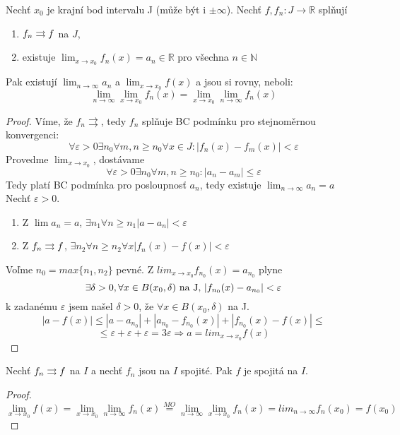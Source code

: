 \begin{vetat}
Nechť $x_0$ je krajní bod intervalu J (může být i $\pm \infty$). Nechť $f, f_n : J \rightarrow \mathbb{R}$ splňují
\begin{enumerate}
\item $f_n \rightrightarrows f$ na $J$,
\item existuje $\lim_{x \rightarrow x_0} f_n(x) = a_n \in \mathbb{R}$ pro všechna $n \in \mathbb{N}$
\end{enumerate}
Pak existují $\lim_{n \rightarrow \infty} a_n$ a $\lim_{x \rightarrow x_0} f(x)$ a jsou si rovny, neboli:
$$\lim_{n \rightarrow \infty} \lim_{x \rightarrow x_0} f_n(x) = \lim_{x \rightarrow x_0} \lim_{n \rightarrow \infty} f_n(x)$$
\end{vetat}
\begin{proof}
Víme, že $f_n \rightrightarrows$, tedy $f_n$ splňuje BC podmínku pro stejnoměrnou konvergenci:
$$\forall \varepsilon > 0 \exists n_0 \forall m,n \geq n_0 \forall x \in J: |f_n(x) - f_m(x)| < \varepsilon $$
Provedme $\lim_{x \to x_0}$, dostávame 
$$\forall \varepsilon>0 \exists n_0 \forall m,n \geq n_0 : |a_n - a_m| \leq \varepsilon$$
Tedy platí BC podmínka pro posloupnosť $a_n$, tedy existuje $\lim_{n \to \infty}a_n = a$
Nechť $\varepsilon > 0$. 
\begin{enumerate}
\item Z $\lim a_n = a$, $ \exists n_1 \forall n \geq n_1 |a - a_n| < \varepsilon $
\item Z $f_n \rightrightarrows f$, $ \exists n_2 \forall n \geq n_2 \forall x |f_n(x) - f(x)| < \varepsilon$
\end{enumerate}
Voľme $n_0 = max \{n_1,n_2\}$ pevné. Z $lim_{x \to x_0}f_{n_0}(x) = a_{n_0}$ plyne 
$$\hbox{$\exists \delta > 0, \forall x \in B(x_0,\delta)$ na J, $|f_{n_0}(x) - a_{n_0}| < \varepsilon$}$$
k zadanému $\varepsilon$ jsem našel $\delta > 0$, že $\forall x \in B(x_0, \delta)$ na J.
$$|a - f(x)| \leq |a - a_{n_0}| + |a_{n_0} - f_{n_0}(x)| + |f_{n_0}(x) - f(x)| \leq $$ $$\leq \varepsilon + \varepsilon + \varepsilon = 3\varepsilon \Rightarrow a=lim_{x \to x_0}f(x)$$
\end{proof}

\begin{dusledek}
Nechť $f_n \rightrightarrows f$ na $I$ a nechť $f_n$ jsou na $I$ spojité. Pak $f$ je spojitá na $I$.
\end{dusledek}
\begin{proof}
$$\lim_{x \to x_0}f(x) = \lim_{x \to x_0} \lim_{n \to \infty}f_n(x) \overset{MO}{=} \lim_{n \to \infty}\lim_{x \to x_0}f_n(x)=lim_{n \to \infty}f_n(x_0) = f(x_0)$$
\end{proof}

